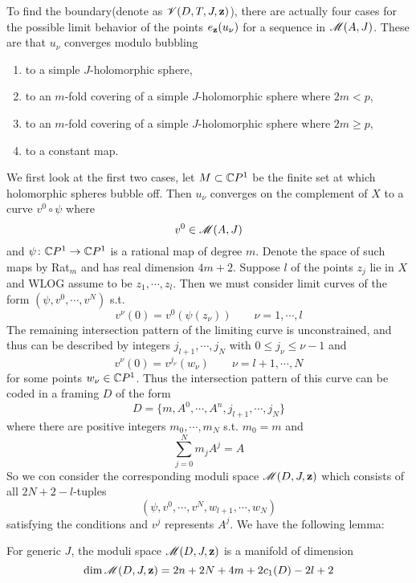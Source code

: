 \documentclass[twoside]{article}
\begin{document}
To find the boundary(denote as $\mathscr{V}(D,T,J,\mathbf{z})$), 
there are actually four cases for the possible limit behavior 
of the points $e_{\mathbf{z}}(u_\nu)$ for a sequence in $\mathscr{M}(A,J)$. 
These are that $u_\nu$ converges modulo bubbling

\begin{enumerate}[label=(\alph*)]
    \item to a simple $J$-holomorphic sphere,
    \item to an $m$-fold covering of a simple $J$-holomorphic sphere where $2m<p$,
    \item to an $m$-fold covering of a simple $J$-holomorphic sphere where $2m\geq p$,
    \item to a constant map.
\end{enumerate}

We first look at the first two cases, let $M\subset\mathbb{C}P^{1}$ be the finite set 
at which holomorphic spheres bubble off. 
Then $u_\nu$ converges on the complement of $X$ to a curve $v^0\circ \psi$ where
\[v^0\in\mathscr{M}(A,J)\]
and $\psi\colon \mathbb{C}P^{1}\rightarrow \mathbb{C}P^{1}$ is a rational map of degree $m$. 
Denote the space of such maps by Rat$_m$ and has real dimension $4m+2$. 
Suppose $l$ of the points $z_j$ lie in $X$ and WLOG assume to be $z_1,\cdots,z_l$. 
Then we must consider limit curves of the form $(\psi,v^0,\cdots,v^N)$ s.t.
\[v^\nu(0)=v^0(\psi(z_\nu))\qquad \nu=1,\cdots,l\]
The remaining intersection pattern of the limiting curve is unconstrained, and thus can be described by integers
$j_{l+1},\cdots,j_N$ with $0\leq j_\nu\leq \nu-1$ and
\[v^\nu(0)=v^{j_\nu}(w_\nu)\qquad \nu=l+1,\cdots,N\]
for some points $w_\nu\in\mathbb{C}P^{1}$. 
Thus the intersection pattern of this curve can be coded in a framing $D$ of the form
\[D=\{m,A^0,\cdots,A^n,j_{l+1},\cdots,j_N\}\]
where there are positive integers $m_0,\cdots,m_N$ s.t. $m_0=m$ and
\[\sum_{j=0}^{N}m_jA^j=A\]
So we con consider the corresponding moduli space $\mathscr{M}(D,J,\mathbf{z})$ 
which consists of all $2N+2-l$-tuples
\[(\psi,v^0,\cdots,v^N,w_{l+1},\cdots,w_{N})\]
satisfying the conditions and $v^j$ represents $A^j$. We have the following lemma:

\begin{lemma}
    For generic $J$, the moduli space $\mathscr{M}(D,J,\mathbf{z})$ is a manifold of dimension
    \[\dim\mathscr{M}(D,J,\mathbf{z})=2n+2N+4m+2c_1(D)-2l+2\]
\end{lemma}
\end{document}
